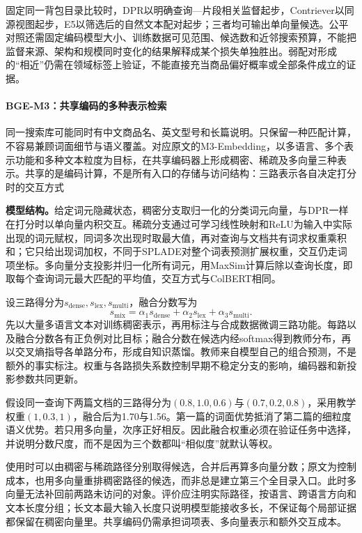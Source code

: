 固定同一背包目录比较时，DPR以明确查询—片段相关监督起步，Contriever以同源视图起步，E5以筛选后的自然文本配对起步；三者均可输出单向量候选。公平对照还需固定编码模型大小、训练数据可见范围、候选数和近邻搜索预算，不能把监督来源、架构和规模同时变化的结果解释成某个损失单独胜出。弱配对形成的“相近”仍需在领域标签上验证，不能直接充当商品偏好概率或全部条件成立的证据。

\Needspace{100mm}
\paragraph{BGE-M3：共享编码的多种表示检索}
\label{sec:rs-search-bge-m3}

同一搜索库可能同时有中文商品名、英文型号和长篇说明。只保留一种匹配计算，不容易兼顾词面细节与语义覆盖。对应原文的M3-Embedding，以多语言、多个表示功能和多种文本粒度为目标，在共享编码器上形成稠密、稀疏及多向量三种表示。共享的是编码计算，不是所有入口的存储与访问结构：三路表示各自决定打分时的交互方式

\textbf{模型结构。}给定词元隐藏状态，稠密分支取归一化的分类词元向量，与DPR一样在打分时以单向量内积交互。稀疏分支通过可学习线性映射和ReLU为输入中实际出现的词元赋权，同词多次出现时取最大值，再对查询与文档共有词求权重乘积和；它只给出现词加权，不同于SPLADE对整个词表预测扩展权重，交互仍走词项坐标。多向量分支投影并归一化所有词元，用MaxSim计算后除以查询长度，即取每个查询词元最大匹配的平均值，交互方式与ColBERT相同。

设三路得分为$s_{\mathrm{dense}},s_{\mathrm{lex}},s_{\mathrm{multi}}$，融合分数写为
\begin{equation}
 s_{\mathrm{mix}}=\alpha_1s_{\mathrm{dense}}+
                  \alpha_2s_{\mathrm{lex}}+\alpha_3s_{\mathrm{multi}} .
 \label{eq:rs-search-bge-m3-fusion}
\end{equation}
先以大量多语言文本对训练稠密表示，再用标注与合成数据微调三路功能。每路以及融合分数各有正负例对比目标；融合分数在候选内经softmax得到教师分布，再以交叉熵指导各单路分布，形成自知识蒸馏。教师来自模型自己的组合预测，不是额外的事实标注。权重与各路损失系数控制早期不稳定分支的影响，编码器和新投影参数共同更新。

假设同一查询下两篇文档的三路得分为$(0.8,1.0,0.6)$与$(0.7,0.2,0.8)$，采用教学权重$(1,0.3,1)$，融合后为1.70与1.56。第一篇的词面优势抵消了第二篇的细粒度语义优势。若只用多向量，次序正好相反。因此融合权重必须在验证任务中选择，并说明分数尺度，而不是因为三个数都叫“相似度”就默认等权。

使用时可以由稠密与稀疏路径分别取得候选，合并后再算多向量分数；原文为控制成本，也用多向量重排稠密路径的候选，而非总是建立第三个全目录入口。此时多向量无法补回前两路未访问的对象。评价应注明实际路径，按语言、跨语言方向和文本长度分组；长文本最大输入长度只说明模型能接收多长，不保证每个局部证据都保留在稠密向量里。共享编码仍需承担词项表、多向量表示和额外交互成本。

